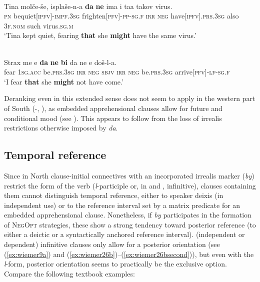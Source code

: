 \documentclass[output=paper,colorlinks,citecolor=brown]{langscibook}
\begin{document}
\ea
\label{ex:wiemer24} 
 \\
\gll Tina molče-še, isplaše-n-a \textbf{da} \textbf{ne} ima i taa takov virus. \\
\textsc{pn} be\textunderscore quiet\textsc{[ipfv]-impf.3sg} frighten\textsc{[pfv]-pp-sg.f} \textsc{irr} \textsc{neg} have\textsc{[ipfv].prs.3sg} also \textsc{3f.nom} such virus\textsc{.sg.m} \\
\glt `Tina kept quiet, fearing \textbf{that} she \textbf{might} have the same virus.' \\
\z


\ea
\label{ex:wiemer25} 
 \\
\gll Strax me e \textbf{da} \textbf{ne} \textbf{bi} da ne e doš-l-a. \\
fear \textsc{1sg.acc} be.\textsc{prs.3sg} \textsc{irr} \textsc{neg} \textsc{sbjv} \textsc{irr} \textsc{neg} be\textsc{.prs.3sg} arrive\textsc{[pfv]-lf-sg.f} \\
\glt `I fear \textbf{that} she \textbf{might} not have come.'
\z

 Deranking even in this extended sense does not seem to apply in the western part of South  (-, ), as embedded apprehensional clauses allow for future and conditional mood (see ). This appears to follow from the loss of irrealis restrictions otherwise imposed by \textit{da}.

\subsection{Temporal reference}
\label{subsec:tempref}

Since in North  clause-initial connectives with an incorporated irrealis marker (\textit{by}) restrict the form of the verb (\textit{l}-participle or, in  and , infinitive), clauses containing them cannot distinguish temporal reference, either to speaker deixis (in independent use) or to the reference interval set by a matrix predicate for an embedded apprehensional clause. Nonetheless, if \textit{by} participates in the formation of \textsc{NegOpt} strategies, these show a strong tendency toward posterior reference (to either a deictic or a syntactically anchored reference interval).  (independent or dependent) infinitive clauses only allow for a posterior orientation (see (\ref{ex:wiemer9a}) and (\ref{ex:wiemer26b})--(\ref{ex:wiemer26bsecond})), but even with the \textit{l}-form, posterior orientation seems to practically be the  exclusive option. Compare the following textbook examples:
\end{document}
